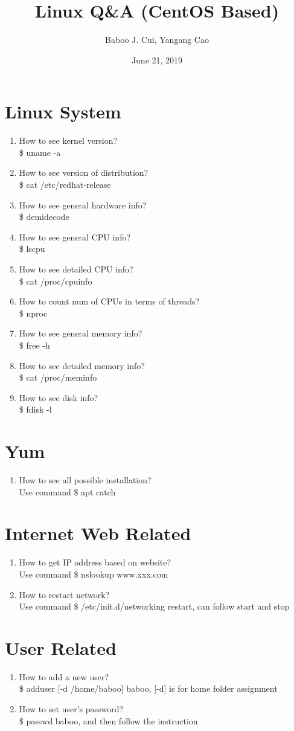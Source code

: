 \documentclass[10pt,a4paper,oneside]{article}
\date{June 21, 2019}
\author{Baboo J. Cui, Yangang Cao}
\title{Linux Q\&A (CentOS Based)}
\begin{document}
\maketitle
\tableofcontents

\newpage

\section{Linux System}
\begin{enumerate}[1.]
\item How to see kernel version?\\
\$ uname -a
\item How to see version of distribution?\\
\$ cat /etc/redhat-release
\item How to see general hardware info?\\
\$ demidecode 
\item How to see general CPU info?\\
\$ lscpu
\item How to see detailed CPU info?\\
\$ cat /proc/cpuinfo
\item How to count num of CPUs in terms of threads?\\
\$ nproc
\item How to see general memory info?\\
\$ free -h
\item How to see detailed memory info?\\
\$ cat /proc/meminfo
\item How to see disk info?\\
\$ fdisk -l
\end{enumerate}
\section{Yum}
\begin{enumerate}[1.]
\item How to see all possible installation?\\
Use command \$ apt catch
\end{enumerate}
\section{Internet Web Related}
\begin{enumerate}[1.]
\item How to get IP address based on website?\\
Use command \$ nslookup www.xxx.com
\item How to restart network?\\
Use command \$ /etc/init.d/networking restart, can follow start and stop
\end{enumerate}
\section{User Related}
\begin{enumerate}[1.]
	\item How to add a new user?\\
	\$ adduser [-d /home/baboo] baboo, [-d] is for home folder assignment 
	\item How to set user’s password?\\
	\$ passwd baboo, and then follow the instruction
\end{enumerate}
\end{document}
